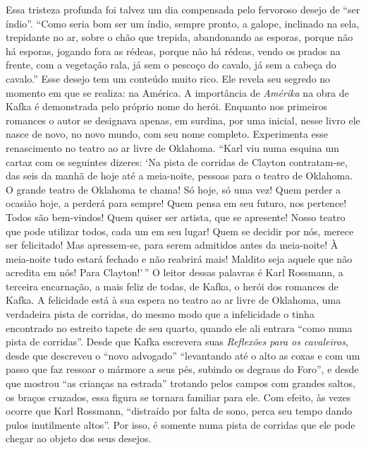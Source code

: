 Essa tristeza profunda foi talvez um dia compensada pelo fervoroso
desejo de ``ser índio''. ``Como seria bom ser um índio, sempre pronto, a
galope, inclinado na sela, trepidante no ar, sobre o chão que trepida,
abandonando as esporas, porque não há esporas, jogando fora as rédeas,
porque não há rédeas, vendo os prados na frente, com a vegetação rala,
já sem o pescoço do cavalo, já sem a cabeça do cavalo.'' Esse desejo tem
um conteúdo muito rico. Ele revela seu segredo no momento em que se
realiza: na América. A importância de \textit{Amérika} na obra de Kafka é
demonstrada pelo próprio nome do herói. Enquanto nos primeiros romances
o autor se designava apenas, em surdina, por uma inicial, nesse livro
ele nasce de novo, no novo mundo, com seu nome completo. Experimenta
esse renascimento no teatro ao ar livre de Oklahoma. ``Karl viu numa
esquina um cartaz com os seguintes dizeres: `Na pista de corridas de
Clayton contratam-se, das seis da manhã de hoje até a meia-noite,
pessoas para o teatro de Oklahoma. O grande teatro de Oklahoma te chama!
Só hoje, só uma vez! Quem perder a ocasião hoje, a perderá para \mbox{sempre}!
Quem pensa em seu futuro, nos pertence! Todos são bem-vindos! Quem
quiser ser artista, que se apresente! Nosso teatro que pode utilizar
todos, cada um em seu lugar! Quem se decidir por nós, merece ser
felicitado! Mas apressem-se, para serem admitidos antes da meia-noite! À
meia-noite tudo estará fechado e não reabrirá mais! Maldito seja aquele
que não acredita em nós! Para Clayton!'\,'' O leitor dessas palavras é
Karl Rossmann, a terceira encarnação, a mais feliz de todas, de Kafka, o
herói dos romances de Kafka. A felicidade está à sua espera no teatro ao
ar livre de Oklahoma, uma verdadeira pista de corridas, do mesmo modo
que a infelicidade o tinha encontrado no estreito tapete de seu quarto,
quando ele ali entrara ``como numa pista de corridas''. Desde que Kafka
escrevera suas \textit{Reflexões para os cavaleiros}, desde que descreveu o
``novo advogado'' ``levantando até o alto as coxas e com um passo que
faz ressoar o mármore a seus pés, subindo os degraus do Foro'', e desde
que mostrou ``as crianças na estrada'' trotando pelos campos com grandes
saltos, os braços cruzados, essa figura se tornara familiar para ele.
Com efeito, às vezes ocorre que Karl Rossmann, ``distraído por falta de
sono, perca seu tempo dando pulos inutilmente altos''. Por isso, é
somente numa pista de corridas que ele pode chegar ao objeto dos seus
desejos.

